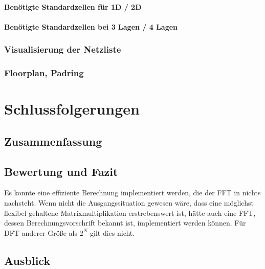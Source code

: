     

 
 \subsubsection{Benötigte Standardzellen für 1D / 2D}
 \subsubsection{Benötigte Standardzellen bei 3 Lagen / 4 Lagen}
 \subsection{Visualisierung der Netzliste}
 
 
 \subsection{Floorplan, Padring}
 
 \chapter{Schlussfolgerungen}
 \section{Zusammenfassung}
 \section{Bewertung und Fazit}
 Es konnte eine effiziente Berechnung implementiert werden, die der FFT in nichts nachsteht. Wenn nicht die Ausgangssituation gewesen wäre, dass eine möglichst flexibel gehaltene
 Matrixmultiplikation erstrebenswert ist, hätte auch eine FFT, dessen Berechnungsvorschrift bekannt ist, implementiert werden können. Für DFT anderer Größe als $2^N$ gilt dies nicht.
 
 
 \section{Ausblick}
 
 
 \printglossary[title={Abkürzungsverzeichnis}] 
 
 \listoffigures

